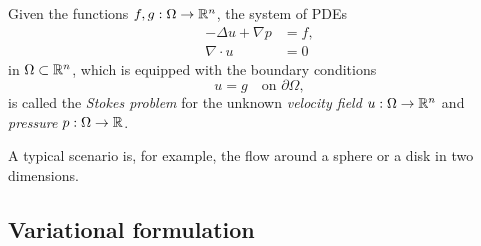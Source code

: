 \begin{definition}
	Given the functions \(f, g: \Omega \to \mathbb{R}^n\), the system of PDEs
	\begin{align*}
		-\Delta u + \nabla p &= f,\\
		\nabla \cdot u &= 0
	\end{align*}
	in \(\Omega \subset \mathbb{R}^n\), which is equipped with the boundary conditions
	\[
		u = g \quad \text{on }\partial\Omega,
	\]
	is called the \emph{Stokes problem} for the unknown \emph{velocity field} \(u: \Omega \to \mathbb{R}^n\) and \emph{pressure} \(p: \Omega \to \mathbb{R}\).
\end{definition}

A typical scenario is, for example, the flow around a sphere or a disk in two dimensions.


\subsection{Variational formulation}

